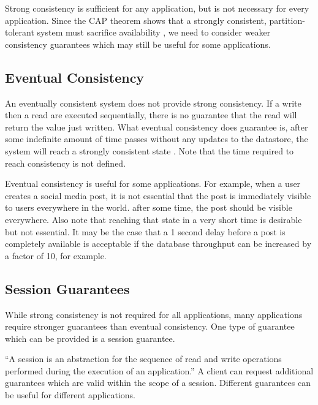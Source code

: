 \documentclass[12pt,a4paper,twoside,openright]{report}
\begin{document}
Strong consistency is sufficient for any application, but is not necessary for every application. Since the CAP theorem shows that a strongly consistent, partition-tolerant system must sacrifice availability \cite{gilbert}, we need to consider weaker consistency guarantees which may still be useful for some applications.

\subsection*{Eventual Consistency}

An eventually consistent system does not provide strong consistency. If a write then a read are executed sequentially, there is no guarantee that the read will return the value just written. What eventual consistency does guarantee is, after some indefinite amount of time passes without any updates to the datastore, the system will reach a strongly consistent state \cite{vogels_2008}. Note that the time required to reach consistency is not defined.

Eventual consistency is useful for some applications. For example, when a user creates a social media post, it is not essential that the post is immediately visible to users everywhere in the world. after some time, the post should be visible everywhere. Also note that reaching that state in a very short time is desirable but not essential. It may be the case that a 1 second delay before a post is completely available is acceptable if the database throughput can be increased by a factor of 10, for example.

\subsection*{Session Guarantees}

While strong consistency is not required for all applications, many applications require stronger guarantees than eventual consistency. One type of guarantee which can be provided is a session guarantee.

``A session is an abstraction for the sequence of read and write operations performed during the execution of an application.'' \cite{terry1994} A client can request additional guarantees which are valid within the scope of a session. Different guarantees can be useful for different applications.
\end{document}
